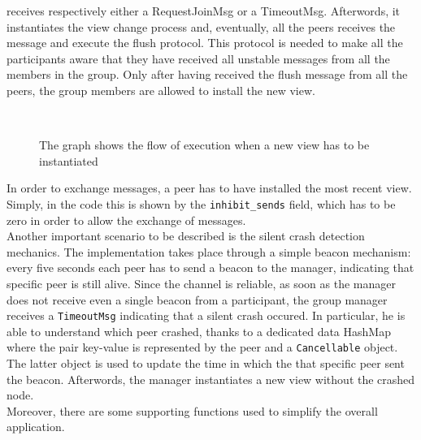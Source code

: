 \documentclass[conference]{IEEEtran}
\begin{document}
receives respectively either a RequestJoinMsg or a TimeoutMsg.
Afterwords, it instantiates the view change process and,
eventually, all the peers receives the message and execute the flush
protocol. This protocol is needed to make all the participants aware
that they have received all unstable messages from all the members
in the group.
Only after having received the flush message from all the peers, the 
group members are allowed to install the new view. \\
\begin{figure}[ht]%
	\centering
	\\%
	\caption{The graph shows the flow of execution when a new view has
	to be instantiated}%
	\label{fig:NewView}%
\end{figure}
In order to exchange messages, a peer has to have installed the most 
recent view. Simply, in the code this is shown by the
\texttt{inhibit\_sends} field, which has to be zero in order to allow 
the exchange of messages. \\
Another important scenario to be described is the silent crash detection
mechanics. The implementation takes place through a simple beacon mechanism:
every five seconds each peer has to send a beacon to the manager, 
indicating that specific peer is still alive. Since the channel 
is reliable, as soon as the manager does not receive even a single beacon from 
a participant, the group manager receives a \texttt{TimeoutMsg}
indicating that a silent crash occured. In particular, he is able to understand
which peer crashed, thanks to a dedicated data HashMap where the pair key-value
is represented by the peer and a \texttt{Cancellable} object. The latter object 
is used to update the time in which the that specific peer sent the beacon.
Afterwords, the manager instantiates a new view without the crashed node.\\
Moreover, there are some supporting functions used to simplify the overall
application. 
\end{document}
